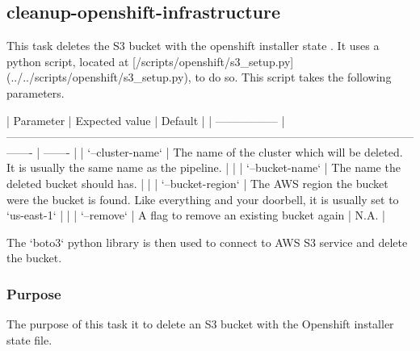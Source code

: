 \subsection{cleanup-openshift-infrastructure}\label{subsec:cleanup-openshift-infrastructure}

This task deletes the S3 bucket with the openshift installer state .
It uses a python script, located at [/scripts/openshift/s3_setup.py](../../scripts/openshift/s3_setup.py), to do so.
This script takes the following parameters.

| Parameter         | Expected value                                                                                                      | Default |
| ----------------- | ------------------------------------------------------------------------------------------------------------------- | ------- |
| `--cluster-name`  | The name of the cluster which will be deleted. It is usually the same name as the pipeline.                         |         |
| `--bucket-name`   | The name the deleted bucket should has.                                                                            |         |
| `--bucket-region` | The AWS region the bucket were the bucket is found. Like everything and your doorbell, it is usually set to `us-east-1` |         |
| `--remove`        | A flag to remove an existing bucket again                                                                           | N.A.    |

The `boto3` python library is then used to connect to AWS S3 service and delete the bucket.

\subsubsection{Purpose}\label{subsubsec:coi-Purpose}

The purpose of this task it to delete an S3 bucket with the Openshift installer state file.
